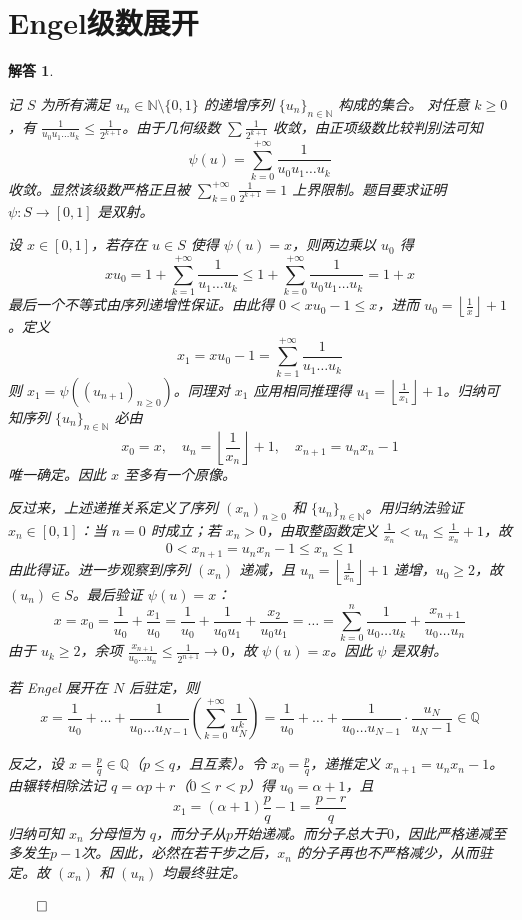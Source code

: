 \documentclass[12pt,UTF8,fontset=none]{ctexbook}
\theoremstyle{exercisestyle}
\theoremstyle{solutionstyle}
\newtheorem*{solution*}{解答}
\newenvironment{solution}
  {\begin{solution*}}
  {\hfill\ensuremath{\qed}\end{solution*}}
\begin{document}
\section{Engel级数展开}
\begin{solution}
\begin{subquestions}
  \item 
  记 $S$ 为所有满足 $u_n \in \mathbb{N}\setminus\{0,1\}$ 的递增序列 $\{u_n\}_{n\in\mathbb{N}}$ 构成的集合。  
  对任意 $k \geq 0$，有 $\frac{1}{u_0 u_1 \dots u_k} \leq \frac{1}{2^{k+1}}$。由于几何级数 $\sum \frac{1}{2^{k+1}}$ 收敛，由正项级数比较判别法可知  
  $$
  \psi(u) = \sum_{k=0}^{+\infty} \frac{1}{u_0 u_1 \dots u_k}
  $$
  收敛。显然该级数严格正且被 $\sum_{k=0}^{+\infty} \frac{1}{2^{k+1}} = 1$ 上界限制。题目要求证明 $\psi: S \to [0,1]$ 是双射。

  设 $x \in [0,1]$，若存在 $u \in S$ 使得 $\psi(u) = x$，则两边乘以 $u_0$ 得  
  $$
  x u_0 = 1 + \sum_{k=1}^{+\infty} \frac{1}{u_1 \dots u_k} \leq 1 + \sum_{k=0}^{+\infty} \frac{1}{u_0 u_1 \dots u_k} = 1 + x
  $$
  最后一个不等式由序列递增性保证。由此得 $0 < x u_0 - 1 \leq x$，进而 $u_0 = \left\lfloor \frac{1}{x} \right\rfloor + 1$。定义  
  $$
  x_1 = x u_0 - 1 = \sum_{k=1}^{+\infty} \frac{1}{u_1 \dots u_k}
  $$
  则 $x_1 = \psi((u_{n+1})_{n\geqslant 0})$。同理对 $x_1$ 应用相同推理得 $u_1 = \left\lfloor \frac{1}{x_1} \right\rfloor + 1$。归纳可知序列 $\{u_n\}_{n\in\mathbb{N}}$ 必由  
  $$
  x_0 = x,\quad u_n = \left\lfloor \frac{1}{x_n} \right\rfloor + 1,\quad x_{n+1} = u_n x_n - 1
  $$
  唯一确定。因此 $x$ 至多有一个原像。

  反过来，上述递推关系定义了序列 $(x_n)_{n\geqslant 0}$ 和 $\{u_n\}_{n\in\mathbb{N}}$。用归纳法验证 $x_n \in [0,1]$：当 $n=0$ 时成立；若 $x_n > 0$，由取整函数定义 $\frac{1}{x_n} < u_n \leq \frac{1}{x_n} + 1$，故  
  $$
  0 < x_{n+1} = u_n x_n - 1 \leq x_n \leq 1
  $$
  由此得证。进一步观察到序列 $(x_n)$ 递减，且 $u_n = \left\lfloor \frac{1}{x_n} \right\rfloor + 1$ 递增，$u_0 \geq 2$，故 $(u_n) \in S$。最后验证 $\psi(u) = x$：  
  $$
  x = x_0 = \frac{1}{u_0} + \frac{x_1}{u_0} = \frac{1}{u_0} + \frac{1}{u_0 u_1} + \frac{x_2}{u_0 u_1} = \dots = \sum_{k=0}^n \frac{1}{u_0 \dots u_k} + \frac{x_{n+1}}{u_0 \dots u_n}
  $$
  由于 $u_k \geq 2$，余项 $\frac{x_{n+1}}{u_0 \dots u_n} \leq \frac{1}{2^{n+1}} \to 0$，故 $\psi(u) = x$。因此 $\psi$ 是双射。

  \item 
  若 Engel 展开在 $N$ 后驻定，则  
  $$
  x = \frac{1}{u_0} + \dots + \frac{1}{u_0 \dots u_{N-1}} \left( \sum_{k=0}^{+\infty} \frac{1}{u_N^k} \right) = \frac{1}{u_0} + \dots + \frac{1}{u_0 \dots u_{N-1}} \cdot \frac{u_N}{u_N - 1} \in \mathbb{Q}
  $$
  
  反之，设 $x = \frac{p}{q} \in \mathbb{Q}$（$p \leq q$，且互素）。令 $x_0 = \frac{p}{q}$，递推定义 $x_{n+1} = u_n x_n - 1$。由辗转相除法记 $q = \alpha p + r$（$0 \leq r < p$）得 $u_0 = \alpha + 1$，且  
  $$
  x_1 = (\alpha + 1)\frac{p}{q} - 1 = \frac{p - r}{q}
  $$
  归纳可知 $x_n$ 分母恒为 $q$，而分子从$p$开始递减。而分子总大于$0$，因此严格递减至多发生$p-1$次。因此，必然在若干步之后，$x_n$ 的分子再也不严格减少，从而驻定。故 $(x_n)$ 和 $(u_n)$ 均最终驻定。  
\end{subquestions}
\end{solution}
\end{document}
